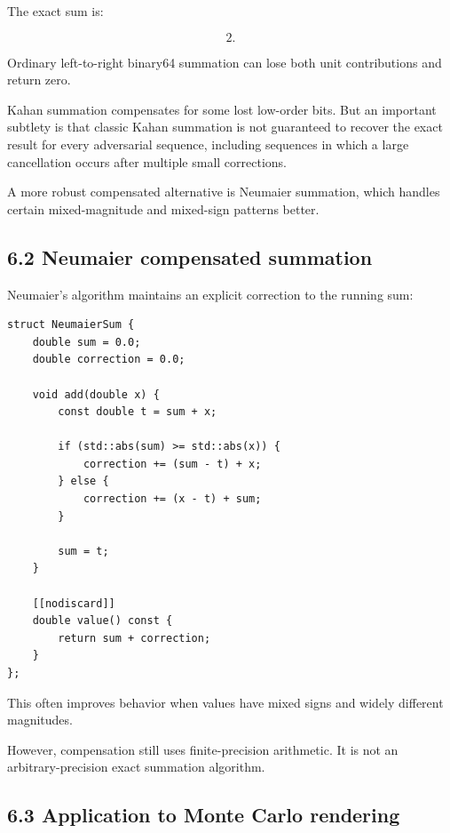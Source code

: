 The exact sum is:

\[ \boxed{2}. \]

Ordinary left-to-right binary64 summation can lose both unit contributions and return zero.

Kahan summation compensates for some lost low-order bits. But an important subtlety is that classic Kahan summation is not guaranteed to recover the exact result for every adversarial sequence, including sequences in which a large cancellation occurs after multiple small corrections.

A more robust compensated alternative is Neumaier summation, which handles certain mixed-magnitude and mixed-sign patterns better.

\subsection{6.2 Neumaier compensated summation}\label{02-foundations-ii-ch028-neumaier-compensated-summation}

\hypertarget{02-foundations-ii-ch028-neumaier-compensated-summation}{}

Neumaier's algorithm maintains an explicit correction to the running sum:

\begin{verbatim}
struct NeumaierSum {
    double sum = 0.0;
    double correction = 0.0;

    void add(double x) {
        const double t = sum + x;

        if (std::abs(sum) >= std::abs(x)) {
            correction += (sum - t) + x;
        } else {
            correction += (x - t) + sum;
        }

        sum = t;
    }

    [[nodiscard]]
    double value() const {
        return sum + correction;
    }
};
\end{verbatim}

This often improves behavior when values have mixed signs and widely different magnitudes.

However, compensation still uses finite-precision arithmetic. It is not an arbitrary-precision exact summation algorithm.

\subsection{6.3 Application to Monte Carlo rendering}\label{02-foundations-ii-ch028-application-to-monte-carlo-rendering}

